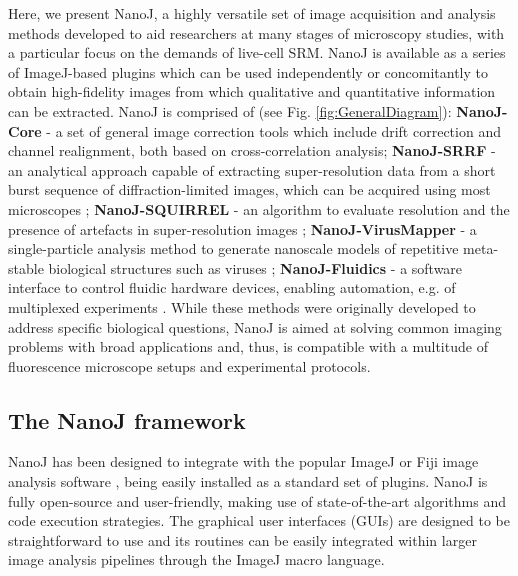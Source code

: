 
 Here, we present NanoJ, a highly versatile set of image acquisition and analysis methods developed to aid researchers at many stages of microscopy studies, with a particular focus on the demands of live-cell SRM. NanoJ is available as a series of ImageJ-based plugins which can be used independently or concomitantly to obtain high-fidelity images from which qualitative and quantitative information can be extracted. NanoJ is comprised of (see Fig. \ref{fig:GeneralDiagram}): \textbf{NanoJ-Core} - a set of general image correction tools which include drift correction and channel realignment, both based on cross-correlation analysis; \textbf{NanoJ-SRRF} - an analytical approach capable of extracting super-resolution data from a short burst sequence of diffraction-limited images, which can be acquired using most microscopes \cite{gustafsson2016fast,culley2018srrf}; \textbf{NanoJ-SQUIRREL} - an algorithm to evaluate resolution and the presence of artefacts in super-resolution images \cite{culley2018quantitative}; \textbf{NanoJ-VirusMapper} - a single-particle analysis method to generate nanoscale models of repetitive meta-stable biological structures such as viruses \cite{Gray2016,Gray2017,gray2018nanoscale}; \textbf{NanoJ-Fluidics} - a software interface to control fluidic hardware devices, enabling automation, e.g. of multiplexed experiments \cite{almada2018automating}. While these methods were originally developed to address specific biological questions, NanoJ is aimed at solving common imaging problems with broad applications and, thus, is compatible with a multitude of fluorescence microscope setups and experimental protocols. 
 
\subsection*{The NanoJ framework}
 NanoJ has been designed to integrate with the popular ImageJ or Fiji image analysis software \cite{abramoff2004image,schindelin2012fiji}, being easily installed as a standard set of plugins. NanoJ is fully open-source and user-friendly, making use of state-of-the-art algorithms and code execution strategies. The graphical user interfaces (GUIs) are designed to be straightforward to use and its routines can be easily integrated within larger image analysis pipelines through the ImageJ macro language.

